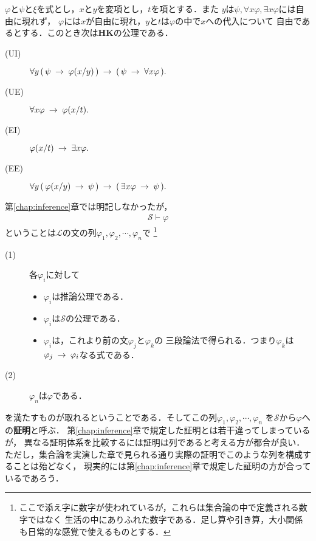 	\begin{screen}
		\begin{logicalaxm}[{\bf HK}の公理(量化)]
			$\varphi$と$\psi$と$\xi$を式とし，$x$と$y$を変項とし，$t$を項とする．また
			$y$は$\psi,\forall x \varphi, \exists x \varphi$には自由に現れず，
			$\varphi$には$x$が自由に現れ，$y$と$t$は$\varphi$の中で$x$への代入について
			自由であるとする．このとき次は{\bf HK}の公理である．
			\begin{description}
				\item[(UI)] $\forall y\, (\, \psi \hspace{0.25em}\rightarrow\hspace{0.25em} \varphi(x/y)\, ) 
					\hspace{0.25em}\rightarrow\hspace{0.25em} (\, \psi \hspace{0.25em}\rightarrow\hspace{0.25em} \forall x \varphi\, ).$
				
				\item[(UE)] $\forall x \varphi \hspace{0.25em}\rightarrow\hspace{0.25em} \varphi(x/t).$
				
				\item[(EI)] $\varphi(x/t) \hspace{0.25em}\rightarrow\hspace{0.25em} \exists x \varphi.$
				
				\item[(EE)] $\forall y\, (\, \varphi(x/y) \hspace{0.25em}\rightarrow\hspace{0.25em} \psi\, )
						\hspace{0.25em}\rightarrow\hspace{0.25em} (\, \exists x \varphi \hspace{0.25em}\rightarrow\hspace{0.25em} \psi\, ).$
			\end{description}
		\end{logicalaxm}
	\end{screen}
	
	第\ref{chap:inference}章では明記しなかったが，
	\begin{align}
		\mathscr{S} \vdash \varphi
	\end{align}
	ということは$\mathcal{L}$の文の列$\varphi_{1},\varphi_{2},\cdots,\varphi_{n}$で
	\footnote{
		ここで添え字に数字が使われているが，これらは集合論の中で定義される数字ではなく
		生活の中にありふれた数字である．足し算や引き算，大小関係も日常的な感覚で使えるものとする．
	}
	\begin{description}
		\item[(1)] 各$\varphi_{i}$に対して
			\begin{itemize}
				\item $\varphi_{i}$は推論公理である．
				\item $\varphi_{i}$は$\mathscr{S}$の公理である．
				\item $\varphi_{i}$は，これより前の文$\varphi_{j}$と$\varphi_{k}$の
					三段論法で得られる．つまり$\varphi_{k}$は
					$\varphi_{j} \hspace{0.25em}\rightarrow\hspace{0.25em} \varphi_{i}$なる式である．
			\end{itemize}
		
		\item[(2)] $\varphi_{n}$は$\varphi$である．
	\end{description}
	を満たすものが取れるということである．そしてこの列$\varphi_{1},\varphi_{2},\cdots,\varphi_{n}$
	を$\mathscr{S}$から$\varphi$への{\bf 証明}と呼ぶ．
	第\ref{chap:inference}章で規定した証明とは若干違ってしまっているが，
	異なる証明体系を比較するには証明は列であると考える方が都合が良い．
	ただし，集合論を実演した章で見られる通り実際の証明でこのような列を構成することは殆どなく，
	現実的には第\ref{chap:inference}章で規定した証明の方が合っているであろう．
	

